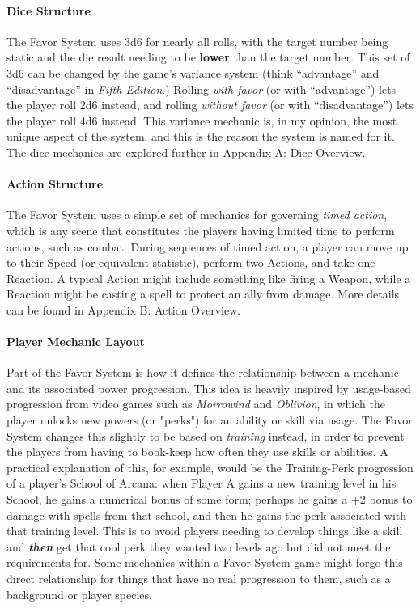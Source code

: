 \documentclass[
]{article}
\begin{document}
\hypertarget{dice-structure}{%
\paragraph{Dice Structure}\label{dice-structure}}

The Favor System uses 3d6 for nearly all rolls, with the target number
being static and the die result needing to be \textbf{lower} than the
target number. This set of 3d6 can be changed by the game's variance
system (think ``advantage'' and ``disadvantage'' in \emph{Fifth
Edition}.) Rolling \emph{with favor} (or with ``advantage'') lets the
player roll 2d6 instead, and rolling \emph{without favor} (or with
``disadvantage'') lets the player roll 4d6 instead. This variance
mechanic is, in my opinion, the most unique aspect of the system, and
this is the reason the system is named for it. The dice mechanics are
explored further in Appendix A: Dice Overview.

\hypertarget{action-structure}{%
\paragraph{Action Structure}\label{action-structure}}

The Favor System uses a simple set of mechanics for governing
\emph{timed action}, which is any scene that constitutes the players
having limited time to perform actions, such as combat. During sequences
of timed action, a player can move up to their Speed (or equivalent
statistic), perform two Actions, and take one Reaction. A typical Action
might include something like firing a Weapon, while a Reaction might be
casting a spell to protect an ally from damage. More details can be
found in Appendix B: Action Overview.

\hypertarget{player-mechanic-layout}{%
\paragraph{Player Mechanic Layout}\label{player-mechanic-layout}}

Part of the Favor System is how it defines the relationship between a
mechanic and its associated power progression. This idea is heavily
inspired by usage-based progression from video games such as
\emph{Morrowind} and \emph{Oblivion}, in which the player unlocks new
powers (or "perks") for an ability or skill via usage. The Favor System
changes this slightly to be based on \emph{training} instead, in order
to prevent the players from having to book-keep how often they use
skills or abilities. A practical explanation of this, for example, would
be the Training-Perk progression of a player's School of Arcana: when
Player A gains a new training level in his School, he gains a numerical
bonus of some form; perhaps he gains a +2 bonus to damage with spells
from that school, and then he gains the perk associated with that
training level. This is to avoid players needing to develop things like
a skill and \textbf{\emph{then}} get that cool perk they wanted two
levels ago but did not meet the requirements for. Some mechanics within
a Favor System game might forgo this direct relationship for things that
have no real progression to them, such as a background or player
species.
\end{document}
